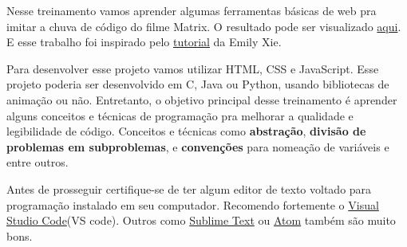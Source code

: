 Nesse treinamento vamos aprender algumas ferramentas básicas de web pra imitar a chuva de código do filme Matrix. O resultado pode ser visualizado \href{https://yudi-azvd.github.io/matrix/}{aqui}. 
E esse trabalho foi inspirado pelo \href{https://www.youtube.com/watch?v=S1TQCi9axzg}{tutorial} da Emily Xie.

Para desenvolver esse projeto vamos utilizar HTML, CSS e JavaScript. Esse projeto poderia ser desenvolvido em C, Java ou Python, usando bibliotecas de animação ou não. Entretanto, o objetivo principal desse treinamento é aprender alguns conceitos e técnicas de programação pra melhorar a qualidade e legibilidade de código. Conceitos e técnicas como \textbf{abstração}, \textbf{divisão de problemas em subproblemas}, e \textbf{convenções} para nomeação de variáveis e entre outros.

Antes de prosseguir certifique-se de ter algum editor de texto voltado para programação instalado em seu computador. Recomendo fortemente o 
\href{https://code.visualstudio.com/}{Visual Studio Code}(VS code). Outros como 
\href{https://www.sublimetext.com/}{Sublime Text} ou 
\href{https://atom.io/}{Atom} também são muito bons.
